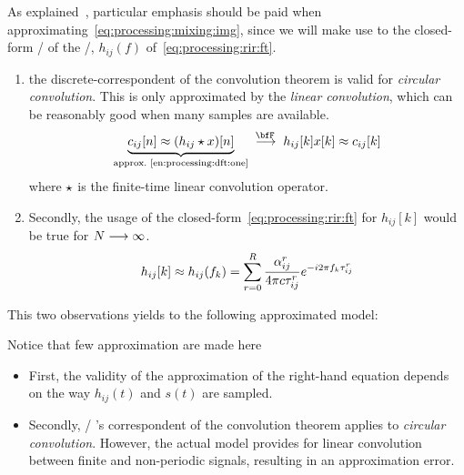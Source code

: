 As explained~\cite{tukuljac2018mulan}, particular emphasis should be paid when approximating~\cref{eq:processing:mixing:img},
since we will make use to the closed-form \FT/ of the \RIR/, $h_{ij}(f)$ of~\cref{eq:processing:rir:ft}.
\begin{enumerate}
    \item\label{en:processing:dft:one}
        the discrete-correspondent of the convolution theorem is valid for \textit{circular convolution}.
    This is only approximated by the \textit{linear convolution}, which can be reasonably good when many samples are available.
    \begin{equation}
        \underbrace{c_{ij}[n] \approx (h_{ij} \convDis x)[n]}_{\text{approx.~\ref{en:processing:dft:one}}}
        \;\overset{\discreteFT{}}{\kto}\;
        h_{ij}[k] x[k] \approx c_{ij}[k]
    \end{equation}
    where $\star$ is the finite-time linear convolution operator.
    \item\label{en:processing:dtf:two}
        Secondly, the usage of the closed-form~\eqref{eq:processing:rir:ft} for $h_{ij}[k]$ would be true for $N\longrightarrow\infty$.
        \begin{equation}
            h_{ij}[ k] \approx h_{ij}( f_k) = \sum_{r=0}^{R}
                        \frac{\alpha_{ij}^r}{4 \pi c \tau_{ij}^r}
                        {e}^{- {i} 2 \pi f_k \tau_{ij}^r}
        \end{equation}
\end{enumerate}
This two observations yields to the following approximated model:

Notice that few approximation are made here
\begin{itemize}
    \item First, the validity of the approximation of the right-hand equation depends on the way $h_{ij}(t)$ and $s(t)$ are sampled.
    \item Secondly, \DFT/ 's correspondent of the convolution theorem applies to \textit{circular convolution}.
          However, the actual model provides for linear convolution between finite and non-periodic signals, resulting in an approximation error.
\end{itemize}

